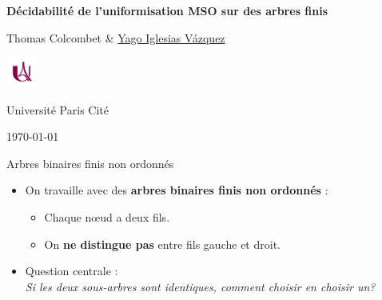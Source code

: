 \documentclass[10pt,xcolor=dvipsnames]{beamer}
\theoremstyle{plain}
\begin{document}
\begin{frame}[plain]
	\centering
	\vspace{1cm}

	{\huge \textbf{Décidabilité de l’uniformisation MSO sur des arbres finis}}

	\vspace{0.5cm}
	{\Large Thomas Colcombet \& \underline{Yago Iglesias Vázquez}}


	\vspace{1cm}
	\begin{minipage}{0.4\textwidth}
		\centering
		\includegraphics[height=1cm]{images/logo.jpg}

		Université Paris Cité
	\end{minipage}

	\vfill
	{\small \today}
\end{frame}



\begin{frame}{Arbres binaires finis non ordonnés}

	\begin{itemize}
		\item On travaille avec des \textbf{arbres binaires finis non ordonnés} :
		      \begin{itemize}
			      \item Chaque nœud a deux fils.
			      \item On \textbf{ne distingue pas} entre fils gauche et droit.
		      \end{itemize}

		      \vspace{0.8em}

		\item Question centrale : \\
		      \textit{Si les deux sous-arbres sont identiques, comment choisir en choisir un?}
	\end{itemize}

	\vspace{1em}

	\centering
\end{frame}
\end{document}
